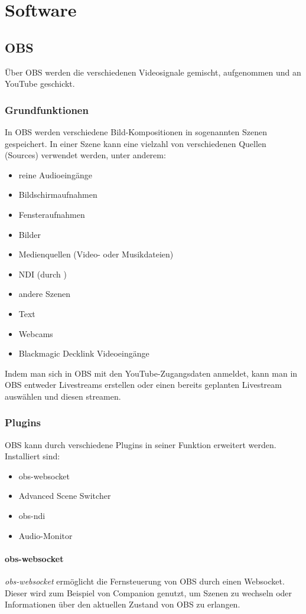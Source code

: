 \chapter{Software}
	\section{OBS}
		Über \Gls{OBS} werden die verschiedenen Videosignale gemischt, aufgenommen und an YouTube geschickt.

		\subsection{Grundfunktionen}
			In \Gls{OBS} werden verschiedene Bild-Kompositionen in sogenannten Szenen gespeichert.
			In einer Szene kann eine vielzahl von verschiedenen Quellen (Sources) verwendet werden, unter anderem:
			\begin{itemize}
				\item reine Audioeingänge
				\item Bildschirmaufnahmen
				\item Fensteraufnahmen
				\item Bilder
				\item Medienquellen (Video- oder Musikdateien)
				\item NDI (durch )
				\item andere Szenen
				\item Text
				\item Webcams
				\item Blackmagic Decklink Videoeingänge
			\end{itemize}
			Indem man sich in \Gls{OBS} mit den YouTube-Zugangsdaten anmeldet, kann man in \Gls{OBS} entweder Livestreams erstellen oder einen bereits geplanten Livestream auswählen und diesen streamen.
		\subsection{Plugins}
			\Gls{OBS} kann durch verschiedene Plugins in seiner Funktion erweitert werden.
			Installiert sind:
			\begin{itemize}
				\item obs-websocket
				\item Advanced Scene Switcher
				\item obs-ndi
				\item Audio-Monitor
			\end{itemize}

			\subsubsection{obs-websocket}
				\textit{obs-websocket} ermöglicht die Fernsteuerung von OBS durch einen Websocket.
				Dieser wird zum Beispiel von Companion genutzt, um Szenen zu wechseln oder Informationen über den aktuellen Zustand von OBS zu erlangen.
